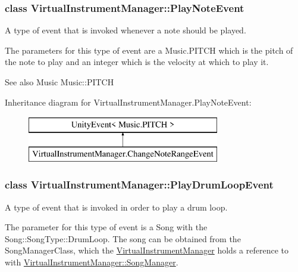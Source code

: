 \subsubsection{class Virtual\+Instrument\+Manager\+:\+:Play\+Note\+Event}
A type of event that is invoked whenever a note should be played. 

The parameters for this type of event are a Music.\+P\+I\+T\+CH which is the pitch of the note to play and an integer which is the velocity at which to play it.

\begin{DoxySeeAlso}{See also}
Music Music\+::\+P\+I\+T\+CH 
\end{DoxySeeAlso}
Inheritance diagram for Virtual\+Instrument\+Manager.\+Play\+Note\+Event\+:\begin{figure}[H]
\begin{center}
\leavevmode
\includegraphics[height=2.000000cm]{group___virtual_instrument_manager}
\end{center}
\end{figure}
\label{class_virtual_instrument_manager_1_1_play_drum_loop_event}
\subsubsection{class Virtual\+Instrument\+Manager\+:\+:Play\+Drum\+Loop\+Event}
A type of event that is invoked in order to play a drum loop. 

The parameter for this type of event is a Song with the Song\+::\+Song\+Type\+::\+Drum\+Loop. The song can be obtained from the Song\+Manager\+Class, which the \hyperlink{group___virtual_instrument_manager_class_virtual_instrument_manager}{Virtual\+Instrument\+Manager} holds a reference to with \hyperlink{group___virtual_instrument_manager_a33dae94932c10c66db76a0eebec76b01}{Virtual\+Instrument\+Manager\+::\+Song\+Manager}.

